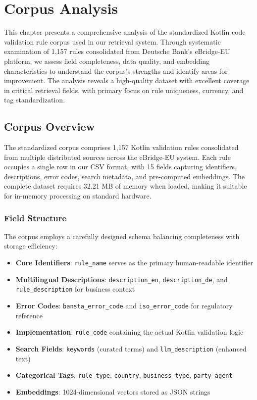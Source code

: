 \chapter{Corpus Analysis}
\label{ch:corpus-analysis}

This chapter presents a comprehensive analysis of the standardized Kotlin code validation rule corpus used in our retrieval system. Through systematic examination of 1,157 rules consolidated from Deutsche Bank's eBridge-EU platform, we assess field completeness, data quality, and embedding characteristics to understand the corpus's strengths and identify areas for improvement. The analysis reveals a high-quality dataset with excellent coverage in critical retrieval fields, with primary focus on rule uniqueness, currency, and tag standardization.

\section{Corpus Overview}

The standardized corpus comprises 1,157 Kotlin validation rules consolidated from multiple distributed sources across the eBridge-EU system. Each rule occupies a single row in our CSV format, with 15 fields capturing identifiers, descriptions, error codes, search metadata, and pre-computed embeddings. The complete dataset requires 32.21 MB of memory when loaded, making it suitable for in-memory processing on standard hardware.

\subsection{Field Structure}

The corpus employs a carefully designed schema balancing completeness with storage efficiency:

\begin{itemize}[leftmargin=*,itemsep=2pt,topsep=2pt]
 \item \textbf{Core Identifiers}: \texttt{rule\_name} serves as the primary human-readable identifier
 \item \textbf{Multilingual Descriptions}: \texttt{description\_en}, \texttt{description\_de}, and \texttt{rule\_description} for business context
 \item \textbf{Error Codes}: \texttt{bansta\_error\_code} and \texttt{iso\_error\_code} for regulatory reference
 \item \textbf{Implementation}: \texttt{rule\_code} containing the actual Kotlin validation logic
 \item \textbf{Search Fields}: \texttt{keywords} (curated terms) and \texttt{llm\_description} (enhanced text)
 \item \textbf{Categorical Tags}: \texttt{rule\_type}, \texttt{country}, \texttt{business\_type}, \texttt{party\_agent}
 \item \textbf{Embeddings}: 1024-dimensional vectors stored as JSON strings
\end{itemize}

